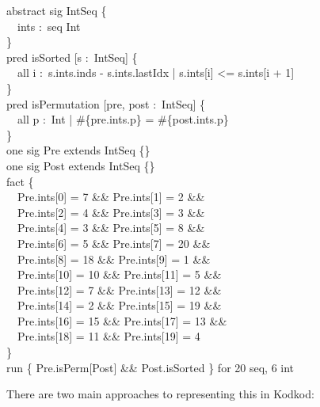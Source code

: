 \documentclass[a4paper,12pt]{article}
\begin{document}
    \pre
    \ttfamily\small
    abstract sig IntSeq \{ \\
    ~~ints :~seq Int \\
    \} \\[2\smallskipamount]
    pred isSorted [s :~IntSeq] \{ \\
    ~~all i :~s.ints.inds - s.ints.lastIdx | s.ints[i] <= s.ints[i + 1] \\
    \} \\
    pred isPermutation [pre, post :~IntSeq] \{ \\
    ~~all p :~Int | \#\{pre.ints.p\} = \#\{post.ints.p\} \\
    \} \\[2\smallskipamount]
    one sig Pre extends IntSeq \{\} \\
    one sig Post extends IntSeq \{\} \\[2\smallskipamount]
    fact \{ \\
    ~~Pre.ints[0] = 7 \&\& Pre.ints[1] = 2 \&\& \\
    ~~Pre.ints[2] = 4 \&\& Pre.ints[3] = 3 \&\& \\
    ~~Pre.ints[4] = 3 \&\& Pre.ints[5] = 8 \&\& \\
    ~~Pre.ints[6] = 5 \&\& Pre.ints[7] = 20 \&\& \\
    ~~Pre.ints[8] = 18 \&\& Pre.ints[9] = 1 \&\& \\
    ~~Pre.ints[10] = 10 \&\& Pre.ints[11] = 5 \&\& \\
    ~~Pre.ints[12] = 7 \&\& Pre.ints[13] = 12 \&\& \\
    ~~Pre.ints[14] = 2 \&\& Pre.ints[15] = 19 \&\& \\
    ~~Pre.ints[16] = 15 \&\& Pre.ints[17] = 13 \&\& \\
    ~~Pre.ints[18] = 11 \&\& Pre.ints[19] = 4 \\
    \} \\[2\smallskipamount]
    run \{ Pre.isPerm[Post] \&\& Post.isSorted \} for 20 seq, 6 int
    \post

    There are two main approaches to representing this in Kodkod:
\end{document}
